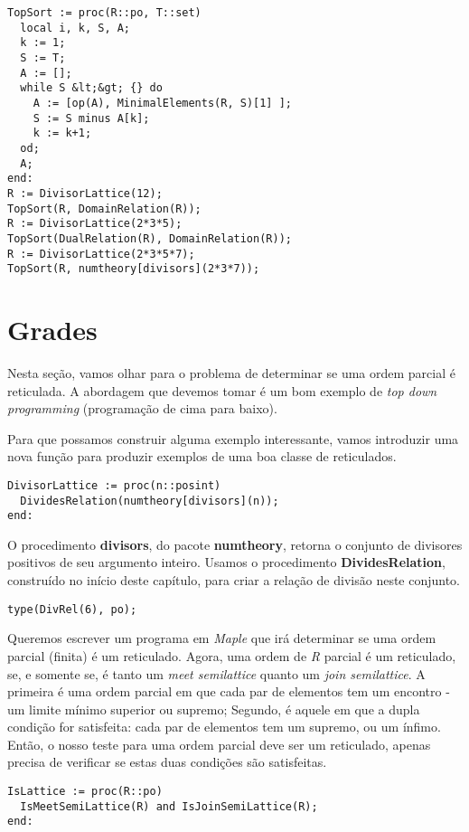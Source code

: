 \documentclass[a4paper]{article}
\begin{document}
\begin{lstlisting}
TopSort := proc(R::po, T::set)
  local i, k, S, A;
  k := 1;
  S := T;
  A := [];
  while S &lt;&gt; {} do
    A := [op(A), MinimalElements(R, S)[1] ];
    S := S minus A[k];
    k := k+1;
  od;
  A;
end:
R := DivisorLattice(12);
TopSort(R, DomainRelation(R));
R := DivisorLattice(2*3*5);
TopSort(DualRelation(R), DomainRelation(R));
R := DivisorLattice(2*3*5*7);
TopSort(R, numtheory[divisors](2*3*7));
\end{lstlisting}

\section{Grades}
Nesta seção, vamos olhar para o problema de determinar se uma ordem parcial é reticulada. A abordagem que devemos tomar é um bom exemplo de \textit{top down programming} (programação de cima para baixo).

Para que possamos construir alguma exemplo interessante, vamos introduzir uma nova função para produzir exemplos de uma boa classe de reticulados.

\begin{lstlisting}
DivisorLattice := proc(n::posint)
  DividesRelation(numtheory[divisors](n));
end:
\end{lstlisting}

O procedimento \textbf{divisors}, do pacote \textbf{numtheory}, retorna o conjunto de divisores positivos de seu argumento inteiro. Usamos o procedimento \textbf{DividesRelation}, construído no início deste capítulo, para criar a relação de divisão neste conjunto.

\begin{lstlisting}
type(DivRel(6), po);
\end{lstlisting}

Queremos escrever um programa em \textit{Maple} que irá determinar se uma ordem parcial (finita) é um reticulado. Agora, uma ordem de \textit{R} parcial é um reticulado, se, e somente se, é tanto um \textit{meet semilattice} quanto um \textit{join semilattice}. A primeira é uma ordem parcial em que cada par de elementos tem um encontro - um limite mínimo superior ou supremo; Segundo, é aquele em que a dupla condição for satisfeita: cada par de elementos tem um supremo, ou um ínfimo. Então, o nosso teste para uma ordem parcial deve ser um reticulado, apenas precisa de verificar se estas duas condições são satisfeitas.

\begin{lstlisting}
IsLattice := proc(R::po)
  IsMeetSemiLattice(R) and IsJoinSemiLattice(R);
end:
\end{lstlisting}
\end{document}
